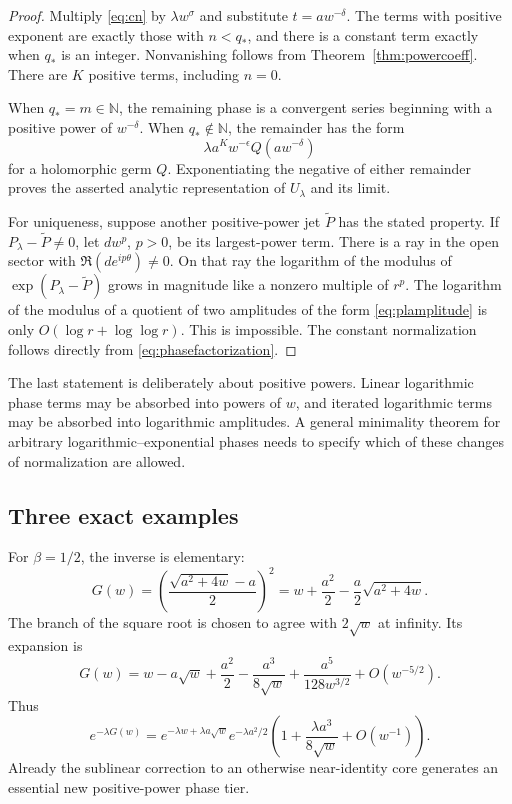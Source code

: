 \documentclass[11pt,a4paper]{article}
\theoremstyle{definition}
\theoremstyle{remark}
\newcommand{\N}{\mathbb N}
\numberwithin{equation}{section}
\begin{document}
\begin{proof}
Multiply \eqref{eq:cn} by $\lambda w^\sigma$ and substitute $t=aw^{-\delta}$. The terms with positive exponent are exactly those with $n<q_*$, and there is a constant term exactly when $q_*$ is an integer. Nonvanishing follows from Theorem~\ref{thm:powercoeff}. There are $K$ positive terms, including $n=0$.

When $q_*=m\in\N$, the remaining phase is a convergent series beginning with a positive power of $w^{-\delta}$. When $q_*\notin\N$, the remainder has the form
\[
 \lambda a^K w^{-\epsilon}Q(aw^{-\delta})
\]
for a holomorphic germ $Q$. Exponentiating the negative of either remainder proves the asserted analytic representation of $U_\lambda$ and its limit.

For uniqueness, suppose another positive-power jet $\widetilde P$ has the stated property. If $P_\lambda-\widetilde P\ne0$, let $dw^p$, $p>0$, be its largest-power term. There is a ray in the open sector with $\Re(de^{ip\theta})\ne0$. On that ray the logarithm of the modulus of $\exp(P_\lambda-\widetilde P)$ grows in magnitude like a nonzero multiple of $r^p$. The logarithm of the modulus of a quotient of two amplitudes of the form \eqref{eq:plamplitude} is only $O(\log r+\log\log r)$. This is impossible. The constant normalization follows directly from \eqref{eq:phasefactorization}.
\end{proof}

The last statement is deliberately about positive powers. Linear logarithmic phase terms may be absorbed into powers of $w$, and iterated logarithmic terms may be absorbed into logarithmic amplitudes. A general minimality theorem for arbitrary logarithmic--exponential phases needs to specify which of these changes of normalization are allowed.

\subsection{Three exact examples}

For $\beta=1/2$, the inverse is elementary:
\begin{equation}\label{eq:sqrtcore}
 G(w)=\left(\frac{\sqrt{a^2+4w}-a}{2}\right)^2
 =w+\frac{a^2}2-\frac a2\sqrt{a^2+4w}.
\end{equation}
The branch of the square root is chosen to agree with $2\sqrt w$ at infinity. Its expansion is
\begin{equation}\label{eq:Gsqrt}
 G(w)=w-a\sqrt w+\frac{a^2}2
 -\frac{a^3}{8\sqrt w}+\frac{a^5}{128w^{3/2}}+O(w^{-5/2}).
\end{equation}
Thus
\begin{equation}\label{eq:firstphaseexample}
 e^{-\lambda G(w)}
 =e^{-\lambda w+\lambda a\sqrt w}e^{-\lambda a^2/2}
 \left(1+\frac{\lambda a^3}{8\sqrt w}+O(w^{-1})\right).
\end{equation}
Already the sublinear correction to an otherwise near-identity core generates an essential new positive-power phase tier.
\end{document}
